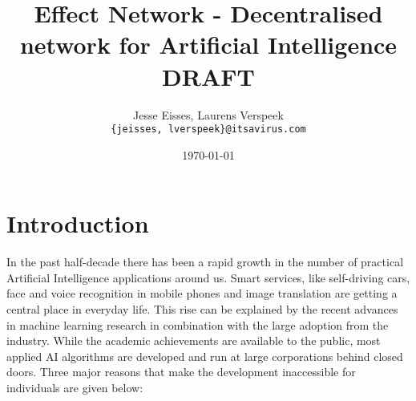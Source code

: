 \documentclass{article}
\title{Effect Network - Decentralised network for Artificial Intelligence \\ \vspace{16pt} \large \textbf{DRAFT}}
\date{\today}
\author{Jesse Eisses, Laurens Verspeek \\
  \small \texttt{\{jeisses, lverspeek\}@itsavirus.com}}
\begin{document}
\maketitle

\begin{abstract}

\end{abstract}


\section{Introduction}
In the past half-decade there has been a rapid growth in the number of
practical Artificial Intelligence applications around us. Smart
services, like self-driving cars, face and voice recognition in mobile
phones and image translation are getting a central place in everyday
life. This rise can be explained by the recent advances in machine
learning research in combination with the large adoption from the
industry. While the academic achievements are available to the public,
most applied AI algorithms are developed and run at large corporations
behind closed doors. Three major reasons that make the development
inaccessible for individuals are given below:
\end{document}
